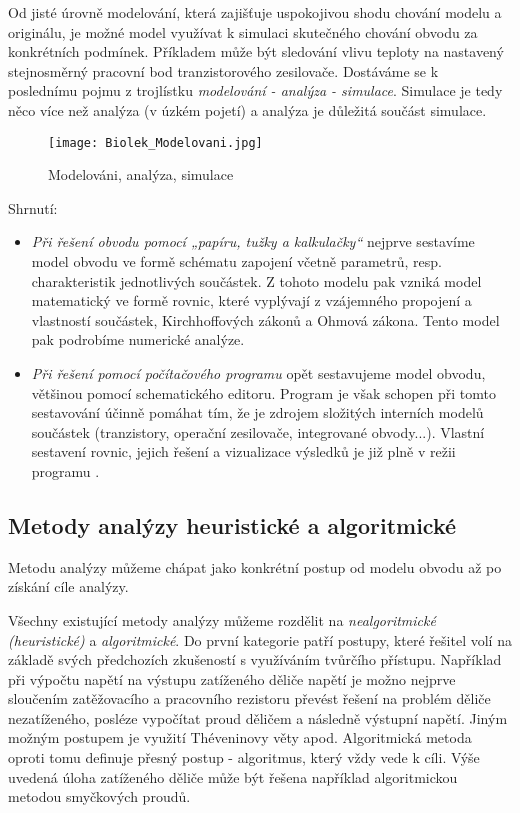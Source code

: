       Od jisté úrovně modelování, která zajišťuje uspokojivou shodu chování modelu a originálu, je 
      možné model využívat k simulaci skutečného chování obvodu za konkrétních podmínek. Příkladem 
      může být sledování vlivu teploty na nastavený stejnosměrný pracovní bod tranzistorového 
      zesilovače. Dostáváme se k poslednímu pojmu z trojlístku \emph{modelování - analýza - 
      simulace}. Simulace je tedy něco více než analýza (v úzkém pojetí) a analýza je důležitá 
      součást simulace.
      
      \begin{figure}[ht!]
        \centering
        \texttt{[image: Biolek\_Modelovani.jpg]}
        \caption{Modelováni, analýza, simulace \cite[s.~17]{Biolek}}
        \label{TEO:fig_modelovani}
      \end{figure}
      
      Shrnutí:
      \begin{itemize}
        \itemsep0em
        \item \emph{Při řešení obvodu pomocí „papíru, tužky a kalkulačky“} nejprve sestavíme model 
              obvodu ve formě schématu zapojení včetně parametrů, resp. charakteristik jednotlivých 
              součástek. Z tohoto modelu pak vzniká model matematický ve formě rovnic, které 
              vyplývají z vzájemného propojení a vlastností součástek, Kirchhoffových zákonů a 
              Ohmová zákona. Tento model pak podrobíme numerické analýze.      
        \item \emph{Při řešení pomocí počítačového programu} opět sestavujeme model obvodu,  
              většinou pomocí schematického editoru. Program je však schopen při tomto sestavování 
              účinně pomáhat tím, že je zdrojem složitých interních modelů součástek (tranzistory, 
              operační zesilovače, integrované obvody...). Vlastní sestavení rovnic, jejich řešení 
              a vizualizace výsledků je již plně v režii programu \cite[s.~18]{Biolek}.
      \end{itemize}
      
    \subsection{Metody analýzy heuristické a algoritmické}
      Metodu analýzy můžeme chápat jako konkrétní postup od modelu obvodu až po získání cíle analýzy.
      
      Všechny existující metody analýzy můžeme rozdělit na \emph{nealgoritmické (heuristické)} a 
      \emph{algoritmické}. Do první kategorie patří postupy, které řešitel volí na základě svých 
      předchozích zkušeností s využíváním tvůrčího přístupu. Například při výpočtu napětí na 
      výstupu zatíženého děliče napětí je možno nejprve sloučením zatěžovacího a pracovního 
      rezistoru převést řešení na problém děliče nezatíženého, posléze vypočítat proud děličem a 
      následně výstupní napětí. Jiným možným postupem je využití Théveninovy věty apod. 
      Algoritmická metoda oproti tomu definuje přesný postup - algoritmus, který vždy vede k cíli. 
      Výše uvedená úloha zatíženého děliče může být řešena například algoritmickou metodou 
      smyčkových proudů.
      
